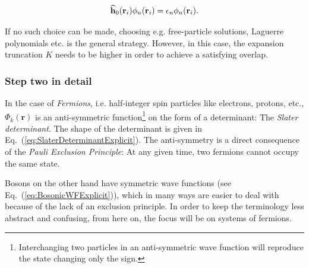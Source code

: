 \begin{equation}
\label{eq:orbitalEigenEq}
 {\bf\widehat{h}}_0(\mathbf{r}_i)\phi_n(\mathbf{r}_i) = \epsilon_n\phi_n(\mathbf{r}_i).
\end{equation}

If no such choice can be made, choosing e.g. free-particle solutions, Laguerre polynomials etc. is the general strategy. However, in this case, the expansion truncation $K$ needs to be higher in order to achieve a satisfying overlap.  


\subsubsection{Step two in detail}

In the case of \textit{Fermions}, i.e. half-integer spin particles like electrons, protons, etc., $\Phi_k(\mathbf{r})$ is an anti-symmetric function\footnote{Interchanging two particles in an anti-symmetric wave function will reproduce the state changing only the sign.} on the form of a determinant: The \textit{Slater determinant}. The shape of the determinant is given in Eq.~(\ref{eq:SlaterDeterminantExplicit}). The anti-symmetry is a direct consequence of the \textit{Pauli Exclusion Principle}: At any given time, two fermions cannot occupy the same state. 

Bosons on the other hand have symmetric wave functions (see Eq.~(\ref{eq:BosonicWFExplicit})), which in many ways are easier to deal with because of the lack of an exclusion principle. In order to keep the terminology less abstract and confusing, from here on, the focus will be on systems of fermions.


